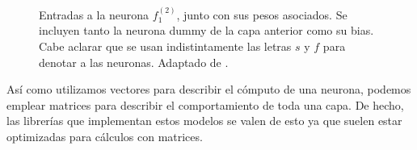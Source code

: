 \documentclass[../../main.tex]{subfiles}
\begin{document}
\begin{figure}[ht]
    \caption{Entradas a la neurona \(f^{(2)}_1\), junto con sus pesos asociados. Se
    incluyen tanto la neurona dummy de la capa anterior como su bias. Cabe aclarar que se
    usan indistintamente las letras \(s\) y \(f\) para denotar a las neuronas. Adaptado de
    \cite{tikz-neural-networks}.}
    \label{fig:neuron-weights}
\end{figure}

Así como utilizamos vectores para describir el cómputo de una neurona, podemos emplear
matrices para describir el comportamiento de toda una capa. De hecho, las librerías que
implementan estos modelos se valen de esto ya que suelen estar optimizadas para cálculos
con matrices.
\end{document}
